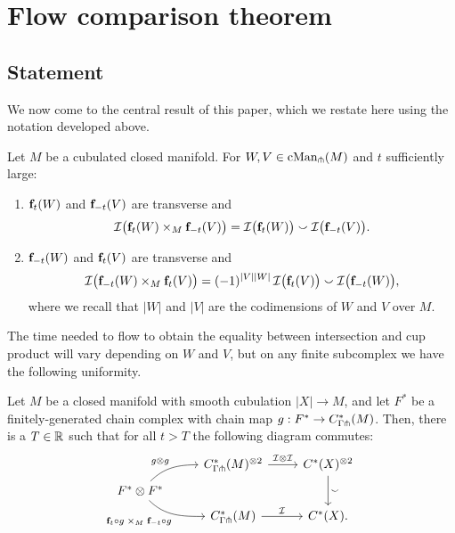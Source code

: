 

\section{Flow comparison theorem} \label{S: flow comparison theorem}

\subsection{Statement}

We now come to the central result of this paper, which we restate here using the notation developed above.

\begin{theorem} \label{T: main theorem}
	Let $M$ be a cubulated closed manifold. For $W, V \in \mathrm{cMan}_\pitchfork(M)$ and $t$ sufficiently large:
	\begin{enumerate}
		\item $\mathbf{f}_t(W)$ and $\mathbf{f}_{-t}(V)$ are transverse and
		\begin{equation*}
		\mathcal{I} \big( \mathbf{f}_t(W) \times_M \mathbf{f}_{-t}(V) \big) =
		\mathcal{I} \big( \mathbf{f}_t(W) \big) \smallsmile \mathcal{I} \big( \mathbf{f}_{-t}(V) \big).
		\end{equation*}
		\item $\mathbf{f}_{-t}(W)$ and $\mathbf{f}_t(V)$ are transverse and
		\begin{equation*}
		\mathcal{I} \big( \mathbf{f}_{-t}(W) \times_M \mathbf{f}_t(V) \big) =
		(-1)^{|V||W|} \, \mathcal{I} \big( \mathbf{f}_t(V) \big) \smallsmile \mathcal{I} \big( \mathbf{f}_{-t}(W) \big),
		\end{equation*}
		where we recall that $|W|$ and $|V|$ are the codimensions of $W$ and $V$ over $M$.
	\end{enumerate}
\end{theorem}

The time needed to flow to obtain the equality between intersection and cup product will vary depending on $W$ and $V$, but on any finite subcomplex we have the following uniformity.

\begin{corollary} \label{C: finite diagram}
	Let $M$ be a closed manifold with smooth cubulation $|X|\to M$, and let $F^*$ be a finitely-generated chain complex with chain map $g:F^*\to C^*_{\Gamma \pitchfork}(M)$.
	Then, there is a $T \in \mathbb{R}$ such that for all $t > T$ the following diagram commutes:
	\begin{equation*}
	\begin{tikzcd} [row sep=tiny]
	& C^*_{\Gamma \pf}(M)^{\otimes 2} \arrow[r, "\cI \otimes \cI"] & \cochains(X)^{\otimes 2} \arrow[dd, "\sms"] \\
	F^*\otimes F^* \arrow[ur, in=180, out=45,"g\otimes g"] \arrow[dr, in=180, out=-45, "\f_t \circ g \; \times_M \; \f_{-t} \circ g"']& & \\
	& C^*_{\Gamma \pf}(M) \arrow[r, "\cI"] & \cochains(X).
	\end{tikzcd}
	\end{equation*}
\end{corollary}

